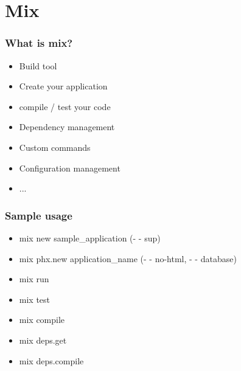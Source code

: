 \section{Mix}

\frame{\tableofcontents[currentsection]}

\begin{frame}
    \frametitle{What is mix?}   
    \begin{itemize}
        \item Build tool
        \item Create your application 
        \item compile / test your code
        \item Dependency management
        \item Custom commands
        \item Configuration management
        \item ...
    \end{itemize}
\end{frame}

\begin{frame}
    \frametitle{Sample usage}   
    \begin{itemize}
        \item mix new sample\_application (- - sup)
        \item mix phx.new application\_name (- - no-html, - - database)
        \vfill        
        \item mix run
        \item mix test
        \item mix compile
        \item mix deps.get
        \item mix deps.compile
    \end{itemize}
\end{frame}
